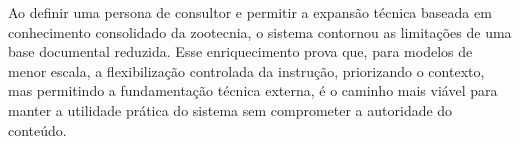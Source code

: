 Ao definir uma persona de consultor e permitir a expansão técnica baseada em conhecimento consolidado da zootecnia, o sistema contornou as limitações de uma base documental reduzida. Esse enriquecimento prova que, para modelos de menor escala, a flexibilização controlada da instrução, priorizando o contexto, mas permitindo a fundamentação técnica externa, é o caminho mais viável para manter a utilidade prática do sistema sem comprometer a autoridade do conteúdo.

